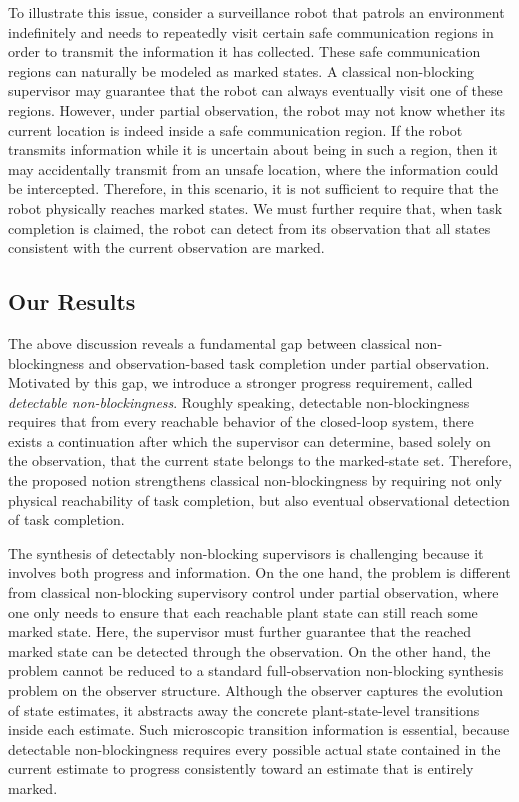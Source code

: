 \documentclass[twocolumn]{autart}
\begin{document}
To illustrate this issue, consider a surveillance robot that patrols an environment indefinitely and needs to repeatedly visit certain safe communication regions in order to transmit the information it has collected.  These safe communication regions can naturally be modeled as marked states.  A classical non-blocking supervisor may guarantee that the robot can always eventually visit one of these regions. However, under partial observation, the robot may not know whether its current location is indeed inside a safe communication region. 
If the robot transmits information while it is uncertain about being in such a region, then it may accidentally transmit from an unsafe location, where the information could be intercepted.  Therefore, in this scenario, it is not sufficient to require that the robot physically reaches marked states.  We must further require that, when task completion is claimed, the robot can detect from its observation that all states consistent with the current observation are marked.

\subsection{Our Results}
The above discussion reveals a fundamental gap between classical non-blockingness and observation-based task completion under partial observation. 
Motivated by this gap, we introduce a stronger progress requirement, called \emph{detectable non-blockingness}.
Roughly speaking, detectable non-blockingness requires that from every reachable behavior of the closed-loop system, there exists a continuation after which the supervisor can determine, based solely on the observation, that the current state belongs to the marked-state set.
Therefore, the proposed notion strengthens classical non-blockingness by requiring not only physical reachability of task completion, but also eventual observational detection of task completion.

The synthesis of detectably non-blocking supervisors is challenging because it involves both progress and information. On the one hand, the problem is different from classical non-blocking supervisory control under partial observation, where one only needs to ensure that each reachable plant state can still reach some marked state. Here, the supervisor must further guarantee that the reached marked state can be detected through the observation.
On the other hand, the problem cannot be reduced to a standard full-observation non-blocking synthesis problem on the observer structure.
Although the observer captures the evolution of state estimates, it abstracts away the concrete plant-state-level transitions inside each estimate.
Such microscopic transition information is essential, because detectable non-blockingness requires every possible actual state contained in the current estimate to progress consistently toward an estimate that is entirely marked.
\end{document}
